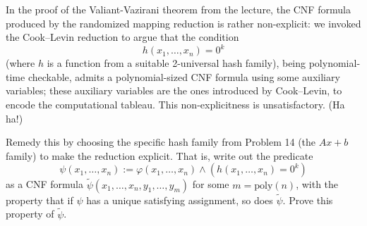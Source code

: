 \documentclass[12pt]{article}
\begin{document}




\begin{problem}{18}
In the proof of the Valiant-Vazirani theorem from the lecture, the CNF formula produced by the randomized mapping reduction is rather non-explicit: we invoked the Cook–Levin reduction to argue that the condition 
\[ h(x_1, \ldots, x_n) = 0^k\]
(where \(h\) is a function from a suitable 2-universal hash family), being polynomial-time checkable, admits a polynomial-sized CNF formula using some auxiliary variables; these auxiliary variables are the ones introduced by Cook–Levin, to encode the computational tableau. This non-explicitness is unsatisfactory. (Ha ha!)

Remedy this by choosing the specific hash family from Problem 14 (the \(A x + b\) family) to make the reduction explicit. That is, write out the predicate
\[
\psi(x_1, \ldots, x_n) := \varphi(x_1, \ldots, x_n) \wedge (h(x_1, \ldots, x_n) = 0^k)
\]
as a CNF formula \(\tilde{\psi}(x_1, \ldots, x_n, y_1, \ldots, y_m)\) for some \(m = \mathrm{poly}(n)\), with the property that if \(\psi\) has a unique satisfying assignment, so does \(\tilde{\psi}\). Prove this property of \(\tilde{\psi}\).
\end{problem}
\end{document}

